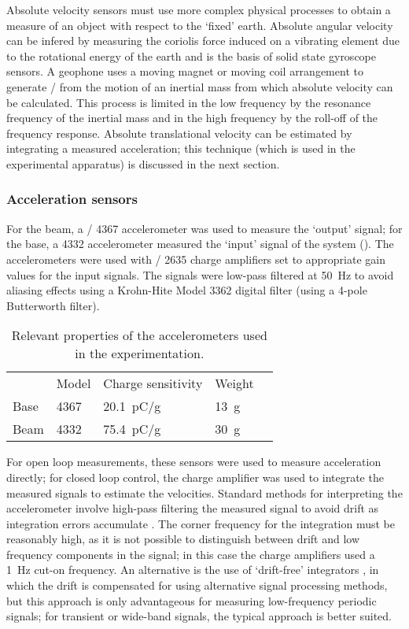 \documentclass[11pt,a4paper]{memoir}
\begin{document}
Absolute velocity sensors must use more complex physical processes to obtain a measure of an object with respect to the `fixed' earth.
Absolute angular velocity can be infered by measuring the coriolis force induced on a vibrating element due to the rotational energy of the earth \cite{konno1996} and is the basis of solid state gyroscope sensors.
A geophone uses a moving magnet or moving coil arrangement to generate \backemf/ from the motion of an inertial mass \cite{oome2009-saa} from which absolute velocity can be calculated.
This process is limited in the low frequency by the resonance frequency of the inertial mass and in the high frequency by the roll-off of the frequency response.
Absolute translational velocity can be estimated by integrating a measured acceleration; this technique (which is used in the experimental apparatus) is discussed in the next section.

\subsubsection{Acceleration sensors}

For the beam, a \BnK/ 4367 accelerometer was used to measure the `output' signal; for the base, a 4332 accelerometer measured the `input' signal of the system ().
The accelerometers were used with \BnK/ 2635 charge amplifiers set to appropriate gain values for the input signals.
The signals were low-pass filtered at \SI{50}{Hz} to avoid aliasing effects using a Krohn-Hite Model 3362 digital filter (using a 4-pole Butterworth filter).

\begin{table}
  \caption{Relevant properties of the accelerometers used in the experimentation.}
  \begin{tabular}{@{}lllll@{}}
    \toprule
           & Model & Charge sensitivity & Weight \\
    \cmidrule{2-4}
      Base & 4367 & \SI{20.1}{pC/g} & \SI{13}{g} \\
      Beam & 4332 & \SI{75.4}{pC/g} & \SI{30}{g} \\
    \bottomrule
  \end{tabular}
\end{table}

For open loop measurements, these sensors were used to measure acceleration directly; for closed loop control, the charge amplifier was used to integrate the measured signals to estimate the velocities.
Standard methods for interpreting the accelerometer involve high-pass filtering the measured signal to avoid drift as integration errors accumulate \cite{brennan2007-jsv}.
The corner frequency for the integration must be reasonably high, as it is not possible to distinguish between drift and low frequency components in the  signal; in this case the charge amplifiers used a \SI{1}{Hz} cut-on frequency.
An alternative is the use of `drift-free' integrators \cite{gavin1998}, in which the drift is compensated for using alternative signal processing methods, but this approach is only advantageous for measuring low-frequency periodic signals; for transient or wide-band signals, the typical approach is better suited.
\end{document}
